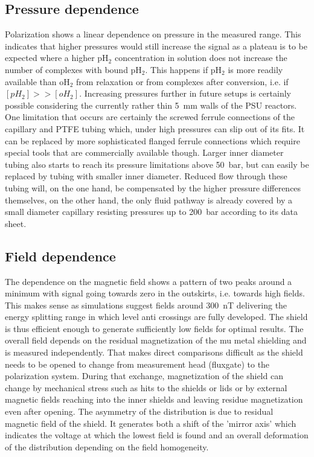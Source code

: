         \subsection{Pressure dependence}
        Polarization shows a linear dependence on pressure in the measured range. This indicates that higher pressures would still increase the signal as a plateau is to be expected where a higher pH$_2$ concentration in solution does not increase the number of complexes with bound pH$_2$. This happens if pH$_2$ is more readily available than oH$_2$ from relaxation or from complexes after conversion, i.e. if $[pH_2]>>[oH_2]$. Increasing pressures further in future setups is certainly possible considering the currently rather thin \SI{5}{\mm} walls of the PSU reactors. One limitation that occurs are certainly the screwed ferrule connections of the capillary and PTFE tubing which, under high pressures can slip out of its fits. It can be replaced by more sophisticated flanged ferrule connections which require special tools that are commercially available though. Larger inner diameter tubing also starts to reach its pressure limitations above \SI{50}{\bar}, but can easily be replaced by tubing with smaller inner diameter. Reduced flow through these tubing will, on the one hand, be compensated by the higher pressure differences themselves, on the other hand, the only fluid pathway is already covered by a small diameter capillary resisting pressures up to \SI{200}{\bar} according to its data sheet.
        \subsection{Field dependence}
        The dependence on the magnetic field shows a pattern of two peaks around a minimum with signal going towards zero in the outskirts, i.e. towards high fields. This makes sense as simulations suggest fields around \SI{300}{\nano\tesla} delivering the energy splitting range in which level anti crossings are fully developed. The shield is thus efficient enough to generate sufficiently low fields for optimal results. The overall field depends on the residual magnetization of the mu metal shielding and is measured independently. That makes direct comparisons difficult as the shield needs to be opened to change from measurement head (fluxgate) to the polarization system. During that exchange, magnetization of the shield can change by mechanical stress such as hits to the shields or lids or by external magnetic fields reaching into the inner shields and leaving residue magnetization even after opening. The asymmetry of the distribution is due to residual magnetic field of the shield. It generates both a shift of the 'mirror axis' which indicates the voltage at which the lowest field is found  and an overall deformation of the distribution depending on the field homogeneity.
